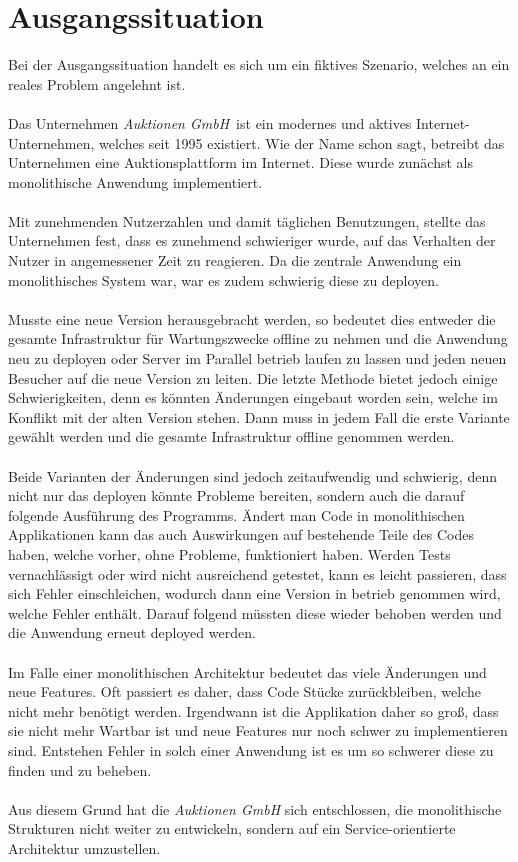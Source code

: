 \section{Ausgangssituation}
\label{sec:ausgangssituation}
Bei der Ausgangssituation handelt es sich um ein fiktives Szenario, welches an ein reales Problem
angelehnt ist.
\\\\
Das Unternehmen \textit{Auktionen GmbH}\ ist ein modernes und aktives Internet-Unternehmen, welches seit 1995 existiert. Wie der Name schon sagt, betreibt das Unternehmen eine Auktionsplattform im Internet. Diese wurde zunächst als monolithische Anwendung implementiert.
\\\\
Mit zunehmenden Nutzerzahlen und damit täglichen Benutzungen, stellte das Unternehmen fest, dass es zunehmend schwieriger wurde, auf das Verhalten der Nutzer in angemessener Zeit zu reagieren. Da die zentrale Anwendung ein monolithisches System war, war es zudem schwierig diese zu deployen.
\\\\
Musste eine neue Version herausgebracht werden, so bedeutet dies entweder die gesamte Infrastruktur für Wartungszwecke offline zu nehmen und die Anwendung neu zu deployen oder Server im Parallel betrieb laufen zu lassen und jeden neuen Besucher auf die neue Version zu leiten. Die letzte Methode bietet jedoch einige Schwierigkeiten, denn es könnten Änderungen eingebaut worden sein, welche im Konflikt mit der alten Version stehen. Dann muss in jedem Fall die erste Variante gewählt werden und die gesamte Infrastruktur offline genommen werden.
\\\\
Beide Varianten der Änderungen sind jedoch zeitaufwendig und schwierig, denn nicht nur das deployen könnte Probleme bereiten, sondern auch die darauf folgende Ausführung des Programms. Ändert man Code in monolithischen Applikationen kann das auch Auswirkungen auf bestehende Teile des Codes haben, welche vorher, ohne Probleme, funktioniert haben. Werden Tests vernachlässigt oder wird nicht ausreichend getestet, kann es leicht passieren, dass sich Fehler einschleichen, wodurch dann eine Version in betrieb genommen wird, welche Fehler enthält. Darauf folgend müssten diese wieder behoben werden und die Anwendung erneut deployed werden.
\\\\
Im Falle einer monolithischen Architektur bedeutet das viele Änderungen und neue Features. Oft passiert es daher, dass Code Stücke zurückbleiben, welche nicht mehr benötigt werden. Irgendwann ist die Applikation daher so groß, dass sie nicht mehr Wartbar ist und neue Features nur noch schwer zu implementieren sind. Entstehen Fehler in solch einer Anwendung ist es um so schwerer diese zu finden und zu beheben.
\\\\
Aus diesem Grund hat die \textit{Auktionen GmbH} sich entschlossen, die monolithische Strukturen nicht weiter zu entwickeln, sondern auf ein Service-orientierte Architektur umzustellen.

